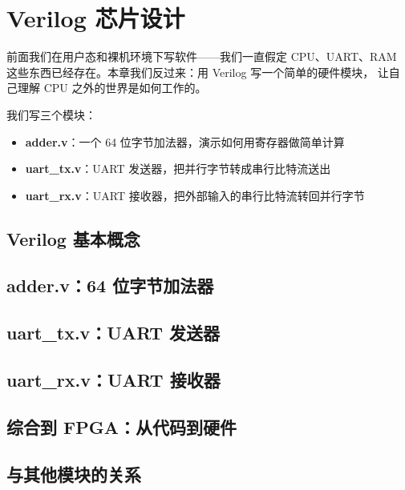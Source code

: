 \chapter{Verilog 芯片设计}

前面我们在用户态和裸机环境下写软件——我们一直假定 CPU、UART、RAM
这些东西已经存在。本章我们反过来：用 Verilog 写一个简单的硬件模块，
让自己理解 CPU 之外的世界是如何工作的。

我们写三个模块：
\begin{itemize}
    \item \textbf{adder.v}：一个 64 位字节加法器，演示如何用寄存器做简单计算
    \item \textbf{uart\_tx.v}：UART 发送器，把并行字节转成串行比特流送出
    \item \textbf{uart\_rx.v}：UART 接收器，把外部输入的串行比特流转回并行字节
\end{itemize}

\section{Verilog 基本概念}


\section{adder.v：64 位字节加法器}


\section{uart\_tx.v：UART 发送器}


\section{uart\_rx.v：UART 接收器}


\section{综合到 FPGA：从代码到硬件}


\section{与其他模块的关系}

